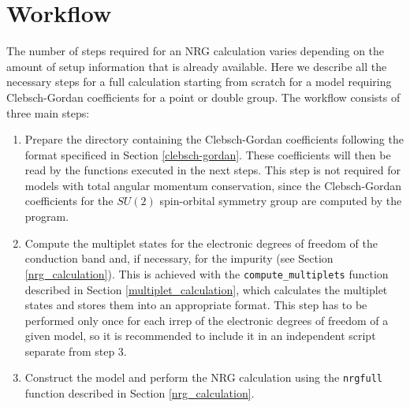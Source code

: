 \documentclass[notitlepage]{article}
\begin{document}
\section{Workflow}\label{workflow}
The number of steps required for an NRG calculation varies
depending on the amount of setup information that is already
available. Here we describe all the necessary steps for a
full calculation starting from scratch for a model requiring
Clebsch-Gordan coefficients for a point or double group.
The workflow consists of three main steps:
\begin{enumerate}
    \item Prepare the directory containing the
        Clebsch-Gordan coefficients following the format
        specificed in Section \ref{clebsch-gordan}. These
        coefficients will then be read by the functions
        executed in the next steps. This step is not
        required for models with total angular momentum
        conservation, since the Clebsch-Gordan coefficients
        for the $SU(2)$ spin-orbital symmetry group are
        computed by the program.
    \item Compute the multiplet states for the electronic
        degrees of freedom of the conduction band and, if
        necessary, for the impurity (see Section
        \ref{nrg_calculation}). This is achieved with the
        \texttt{compute\_multiplets} function described in
        Section \ref{multiplet_calculation}, which
        calculates the multiplet states and stores them into
        an appropriate format. This step has to be performed
        only once for each irrep of the electronic degrees
        of freedom of a given model, so it is recommended to
        include it in an independent script separate from
        step 3.
    \item Construct the model and perform the NRG
        calculation using the \texttt{nrgfull} function
        described in Section \ref{nrg_calculation}.
\end{enumerate}
\end{document}
